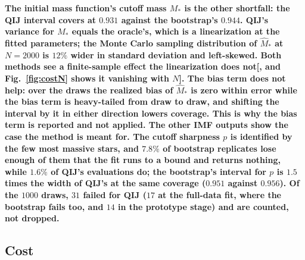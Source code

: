 \documentclass[runningheads]{llncs}
\newif\ifrev \revtrue
\newcommand{\rev}[1]{\ifrev{\color{blue}\bfseries #1}\else#1\fi}
\newcommand{\pending}[1]{{\color{red}[#1]}}
\begin{document}
\rev{The initial mass function's cutoff mass $M_*$ is the other shortfall: the QIJ interval covers at $0.931$ against the bootstrap's $0.944$. QIJ's variance for $M_*$ equals the oracle's, which is a linearization at the fitted parameters; the Monte Carlo sampling distribution of $\hat M_*$ at $N = 2000$ is $12\%$ wider in standard deviation and left-skewed. Both methods see a finite-sample effect the linearization does not\pending{, and Fig.~\ref{fig:costN} shows it vanishing with $N$}. The bias term does not help: over the draws the realized bias of $\hat M_*$ is zero within error while the bias term is heavy-tailed from draw to draw, and shifting the interval by it in either direction lowers coverage. This is why the bias term is reported and not applied. The other IMF outputs show the case the method is meant for. The cutoff sharpness $p$ is identified by the few most massive stars, and $7.8\%$ of bootstrap replicates lose enough of them that the fit runs to a bound and returns nothing, while $1.6\%$ of QIJ's evaluations do; the bootstrap's interval for $p$ is $1.5$ times the width of QIJ's at the same coverage ($0.951$ against $0.956$). Of the $1000$ draws, $31$ failed for QIJ ($17$ at the full-data fit, where the bootstrap fails too, and $14$ in the prototype stage) and are counted, not dropped.}

\subsection{Cost}\label{sec:res-compute}
\end{document}
